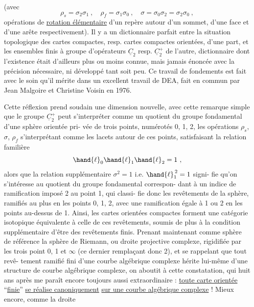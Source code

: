 
(avec
\[ \rho_s = \sigma_2\sigma_1 \ , \quad \rho_f = \sigma_1\sigma_0 \ , \quad \sigma = \sigma_0\sigma_2 = \sigma_2\sigma_0 \ , \]
opérations de \uline{rotation élémentaire} d'un repère autour d'un sommet,
d'une face et d'une arête respectivement). Il y a un dictionnaire
parfait entre la situation topologique des cartes compactes, resp.
cartes compactes orientées, d'une part, et les ensembles finis à
groupe d'opérateurs $\underline{C}_2$ resp. $\underline{C}_2^+$ de l'autre, dictionnaire dont
l'existence était d'ailleurs plus ou moins connue, mais jamais
énoncée avec la précision nécessaire, ni développé tant soit peu.
Ce travail de fondements est fait avec le soin qu'il mérite dans
un excellent travail de DEA, fait en commun par Jean Malgoire et
Christine Voisin en 1976.

Cette réflexion prend soudain une dimension nouvelle,
avec cette remarque simple que le groupe $\underline{C}_2^+$ peut s'interpréter
comme un quotient du groupe fondamental d'une sphère orientée pri-%
vée de trois points, numérotés 0, 1, 2, les opérations $\rho_s$, $\sigma$, $\rho_f$
s'interprétant comme les lacets autour de ces points, satisfaisant
la relation familière
\[ \hand{\ell}_0\hand{\ell}_1\hand{\ell}_2 = 1 \ , \]
alors que la relation supplémentaire $\sigma^2 = 1$ i.e. $\hand{\ell}_1^{\,2} = 1$ signi-%
fie qu'on s'intéresse au quotient du groupe fondamental correspon-%
dant à un indice de ramification imposé 2 au point 1, qui classi-%
fie donc les revêtements de la sphère, ramifiés au plus en les
points 0, 1, 2, avec une ramification égale à 1 ou 2 en les points
au-dessus de 1. Ainsi, les cartes orientées compactes forment une
catégorie isotopique équivalente à celle de ces revêtements, soumis
de plus à la condition supplémentaire d'être des revêtements finis.
Prenant maintenant comme sphère de référence la sphère de Riemann,
ou droite projective complexe, rigidifiée par les trois point 0, 1
et $\infty$ (ce dernier remplaçant donc 2), et se rappelant que tout revê-%
tement ramifié fini d'une courbe algébrique complexe hérite lui-même
d'une structure de courbe algébrique complexe, on aboutit à cette
constatation, qui huit ans après me paraît encore toujours aussi
extraordinaire : \uline{toute carte orientée} ``\uline{finie}'' \uline{se réalise canoniquement}
\uline{sur une courbe algébrique complexe} ! Mieux encore, comme la droite

